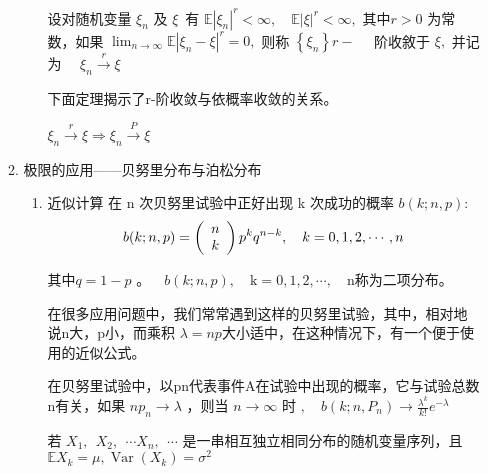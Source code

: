 \begin{enumerate}[1]
\begin{enumerate}[1)]
\begin{enumerate}[ a) ]
						\begin{mydef}  设对随机变量  $ \xi_{n}$  及 $\xi $\
							有 $  \mathbb{E}\left|\xi_{n}\right|^{r}<\infty, \quad \mathbb{E}|\xi|^{r}<\infty,$ \quad 
							其中$ r>0 $ 为常数，如果  $ \lim_{n \rightarrow \infty} \mathbb{E} \left|\xi_{n}-\xi\right|^{r}=0, $  则称 $ \left\{\xi_{n}\right\} r - $ \ \ 
							阶收敘于 $  \xi, $ 并记为  \ \  $ \xi_{n} \stackrel{r}{\longrightarrow} \xi $
						\end{mydef}
						下面定理揭示了r-阶收敛与依概率收敛的关系。
						
						\begin{theorem}
							$ \xi_{n} \stackrel{r}{\longrightarrow} \xi \Longrightarrow \xi_{n} \stackrel{P}{\longrightarrow} \xi $
						\end{theorem}
						
					\end{enumerate}
				\item 极限的应用——贝努里分布与泊松分布
					\begin{enumerate}[ a) ]
						\item 近似计算
							在 n 次贝努里试验中正好出现 k 次成功的概率 $ b (k;n, p): $
							\begin{eqnarray}
							b(k ; n, p) = \left(\begin{array}{c}
							n  \\  k
							\end{array}\right) p^{k} q^{n-k}, \quad k = 0,1,2, \cdots, n \notag
							\end{eqnarray}
							
							其中$ q=1-p$ 。$ \quad b(k ; n, p), \quad 
							\mathrm{k}=0,1,2, \cdots, \quad \mathrm{n} $称为二项分布。
							
							在很多应用问题中，我们常常遇到这样的贝努里试验，其中，相对地说n大，p小，而乘积
							$ \lambda=n p $大小适中，在这种情况下，有一个便于使用的近似公式。
							
							\begin{theorem}[泊松]
								在贝努里试验中，以pn代表事件A在试验中出现的概率，它与试验总数n有关，如果 $ n p_{n} \rightarrow \lambda $ ，则当 $ n \rightarrow \infty \text { 时 }, \quad b\left(k ; n, P_{n}\right) \rightarrow \frac{\lambda^{k}}{k !} e^{-\lambda} $ 
							\end{theorem}
						
						若 $ X_{1}, \ \  X_{2}, \ \  \cdots X_{n}, \ \   \cdots $ 是一串相互独立相同分布的随机变量序列，且 $ \mathbb{E} X_{k}=\mu, 
						\operatorname{Var}\left(X_{k}\right)=\sigma^{2} $
						

\end{enumerate}
\end{enumerate}
\end{enumerate}
